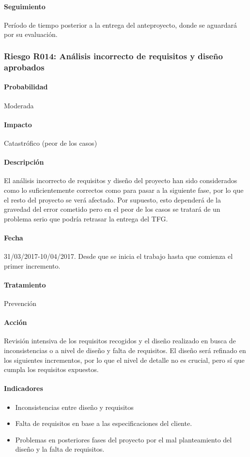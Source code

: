\documentclass[10pt,a4paper]{article}
\begin{document}
				\paragraph{Seguimiento}	Período de tiempo posterior a la entrega del anteproyecto, donde se aguardará por su evaluación.
				
			\subsubsection{Riesgo R014: Análisis incorrecto de requisitos y diseño aprobados}
				\paragraph{Probabilidad} Moderada
				\paragraph{Impacto}	Catastrófico (peor de los casos)
				\paragraph{Descripción} El análisis incorrecto de requisitos y diseño del proyecto han sido considerados como lo suficientemente correctos como para pasar a la siguiente fase, por lo que el resto del proyecto se verá afectado. Por supuesto, esto dependerá de la gravedad del error cometido pero en el peor de los casos se tratará de un problema serio que podría retrasar la entrega del TFG.
				\paragraph{Fecha} 31/03/2017-10/04/2017. Desde que se inicia el trabajo hasta que comienza el primer incremento.
				\paragraph{Tratamiento} Prevención
				\paragraph{Acción} Revisión intensiva de los requisitos recogidos y el diseño realizado en busca de inconsistencias o a nivel de diseño y falta de requisitos. El diseño será refinado en los siguientes incrementos, por lo que el nivel de detalle no es crucial, pero sí que cumpla los requisitos expuestos.
				\paragraph{Indicadores} 
				    \begin{itemize}
				        \item Inconsistencias entre diseño y requisitos
				        \item Falta de requisitos en base a las especificaciones del cliente.
				        \item Problemas en posteriores fases del proyecto por el mal planteamiento del diseño y la falta de requisitos.
				    \end{itemize}
\end{document}
